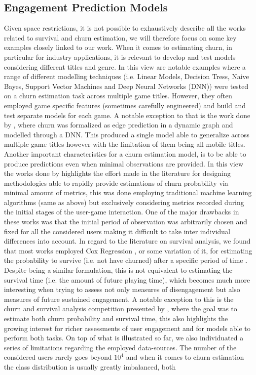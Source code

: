 \subsection{Engagement Prediction Models}
\label{engagement_prediction}
Given space restrictions, it is not possible to exhaustively describe all the works related to survival and churn estimation, we will therefore focus on some key examples closely linked to our work. When it comes to estimating churn, in particular for industry applications, it is relevant to develop and test models considering different titles and genre. In this view \cite{runge2014churn, hadiji2014predicting, xie2015predicting, kim2017churn} are notable examples where a range of different modelling techniques (i.e. Linear Models, Decision Tress, Naive Bayes, Support Vector Machines and Deep Neural Networks (DNN)) were tested on a churn estimation task across multiple game titles. However, they often employed game specific features (sometimes carefully engineered) and build and test separate models for each game. A notable exception to that is the work done by \cite{liu2018semi}, where churn was formalized as edge prediction in a dynamic graph and modelled through a DNN. This produced a single model able to generalize across multiple game titles however with the limitation of them being all mobile titles. Another important characteristics for a churn estimation model, is to be able to produce predictions even when minimal observations are provided. In this view the works done by \cite{drachen2016rapid, milovsevic2017early} highlights the effort made in the literature for designing methodologies able to rapidly provide estimations of churn probability via minimal amount of metrics, this was done employing traditional machine learning algorithms (same as above) but exclusively considering metrics recorded during the initial stages of the user-game interaction. One of the major drawbacks in these works was that the initial period of observation was arbitrarily chosen and fixed for all the considered users making it difficult to take inter individual differences into account. In regard to the literature on survival analysis, we found that most works employed Cox Regression \cite{cox1972regression}, or some variation of it, for estimating the probability to survive (i.e. not have churned) after a specific period of time \cite{perianez2016churn, bertens2017games, demediuk2018player}. Despite being a similar formulation, this is not equivalent to estimating the survival time (i.e. the amount of future playing time), which becomes much more interesting when trying to assess not only measures of disengagement but also measures of future sustained engagement. A notable exception to this is the churn and survival analysis competition presented by \cite{liu2018semi}, where the goal was to estimate both churn probability and survival time, this also highlights the growing interest for richer assessments of user engagement and for models able to perform both tasks. On top of what is illustrated so far, we also individuated a series of limitations regarding the employed data-sources. The number of the considered users rarely goes beyond $10^4$ \cite{liu2018semi} and when it comes to churn estimation the class distribution is usually greatly imbalanced, both 